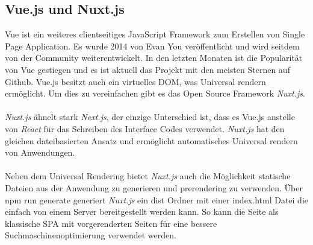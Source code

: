 \documentclass[runningheads]{llncs}
\numberwithin{figure}{section}
\begin{document}
\subsection{Vue.js und Nuxt.js}
\label{subsec:Vue.js und Nuxt.js}
Vue ist ein weiteres clientseitiges JavaScript Framework 
zum Erstellen von Single Page Application. 
Es wurde 2014 von Evan You veröffentlicht und 
wird seitdem von der Community weiterentwickelt. 
In den letzten Monaten ist die Popularität von Vue gestiegen und 
es ist aktuell das Projekt mit den meisten Sternen auf Github. 
Vue.js besitzt auch ein virtuelles DOM, 
was Universal rendern ermöglicht. 
Um dies zu vereinfachen gibt es das Open Source Framework \textit{Nuxt.js}. \cite{vue.jsserver-sideguide}
\\
\\
\textit{Nuxt.js} ähnelt stark \textit{Next.js}, 
der einzige Unterschied ist, 
dass es Vue.js anstelle von \textit{React} für das Schreiben des Interface Codes verwendet. 
\textit{Nuxt.js} hat den gleichen dateibasierten Ansatz und ermöglicht automatisches Universal rendern von Anwendungen.
\\
\\
Neben dem Universal Rendering bietet \textit{Nuxt.js} auch die Möglichkeit statische Dateien aus der Anwendung zu generieren und 
prerendering zu verwenden.
Über npm run generate generiert \textit{Nuxt.js} ein dist Ordner mit einer index.html Datei 
die einfach von einem Server bereitgestellt werden kann. 
So kann die Seite als klassische SPA mit vorgerenderten Seiten für eine bessere Suchmaschinenoptimierung verwendet werden.
\end{document}

